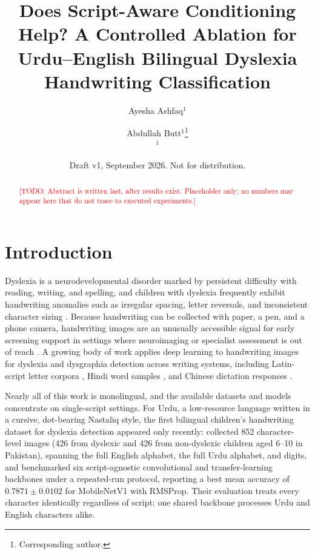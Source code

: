 \documentclass[11pt,a4paper]{article}
\title{Does Script-Aware Conditioning Help? A Controlled Ablation for
Urdu--English Bilingual Dyslexia Handwriting Classification}
\author{%
Ayesha Ashfaq$^{1}$ \and Abdullah Butt$^{1}$\thanks{Corresponding
author.}\\
$^{1}$\todonote{affiliation}%
}
\date{Draft v1, September 2026. Not for distribution.}
\newcommand{\todonote}[1]{\textcolor{red}{[TODO: #1]}}
\begin{document}
\maketitle

\begin{abstract}
\todonote{Abstract is written last, after results exist. Placeholder
only; no numbers may appear here that do not trace to executed
experiments.}
\end{abstract}

\section{Introduction}

Dyslexia is a neurodevelopmental disorder marked by persistent
difficulty with reading, writing, and spelling, and children with
dyslexia frequently exhibit handwriting anomalies such as irregular
spacing, letter reversals, and inconsistent character sizing
\citep{kashif2026}. Because handwriting can be collected with paper,
a pen, and a phone camera, handwriting images are an unusually
accessible signal for early screening support in settings where
neuroimaging or specialist assessment is out of reach
\citep{kashif2026, kunhoth2022}. A growing body of work applies deep
learning to handwriting images for dyslexia and dysgraphia detection
across writing systems, including Latin-script letter corpora
\citep{isa2019, alqahtani2023, robaa2024}, Hindi word samples
\citep{yogarajah2020}, and Chinese dictation responses
\citep{liu2024dysditect}.

Nearly all of this work is monolingual, and the available datasets
and models concentrate on single-script settings. For Urdu, a
low-resource language written in a cursive, dot-bearing Nastaliq
style, the first bilingual children's handwriting dataset for
dyslexia detection appeared only recently: \citet{kashif2026}
collected 852 character-level images (426 from dyslexic and 426 from
non-dyslexic children aged 6--10 in Pakistan), spanning the full
English alphabet, the full Urdu alphabet, and digits, and benchmarked
six script-agnostic convolutional and transfer-learning backbones
under a repeated-run protocol, reporting a best mean accuracy of
$0.7871 \pm 0.0102$ for MobileNetV1 with RMSProp. Their evaluation
treats every character identically regardless of script: one shared
backbone processes Urdu and English characters alike.
\end{document}
